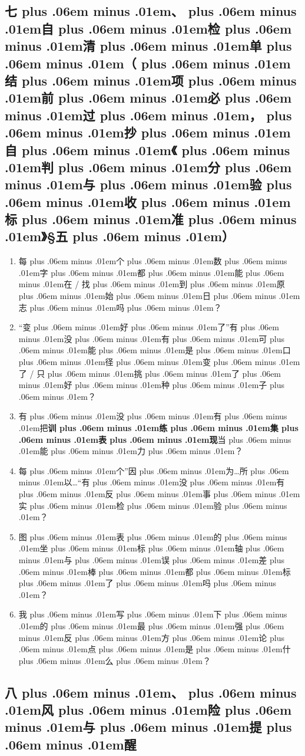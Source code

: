 \documentclass[
]{article}
\newcommand{\passthrough}[1]{#1}
\providecommand{\tightlist}{%
  \setlength{\itemsep}{0pt}\setlength{\parskip}{0pt}}
\def\zh#1{{\zhfont #1}}
\def\sym#1{{\symfont #1}}
\def\codezh#1{{\zhmonofont #1}}
\def\zhglue{\hskip0pt plus .06em minus .01em}
\begin{document}
\subsection{\zh{七\zhglue 、\zhglue 自\zhglue 检\zhglue 清\zhglue 单\zhglue （\zhglue 结\zhglue 项\zhglue 前\zhglue 必\zhglue 过\zhglue ，\zhglue 抄\zhglue 自\zhglue 《\zhglue 判\zhglue 分\zhglue 与\zhglue 验\zhglue 收\zhglue 标\zhglue 准\zhglue 》}\sym{§}\zh{五\zhglue ）}}\label{ux4e03ux81eaux68c0ux6e05ux5355ux7ed3ux9879ux524dux5fc5ux8fc7ux6284ux81eaux5224ux5206ux4e0eux9a8cux6536ux6807ux51c6ux4e94}

\begin{enumerate}
\def\labelenumi{\arabic{enumi}.}
\tightlist
\item
  \zh{每\zhglue 个\zhglue 数\zhglue 字\zhglue 都\zhglue 能\zhglue 在} \passthrough{\codezh{{\zh{证}}{\zh{据}}/}} \zh{找\zhglue 到\zhglue 原\zhglue 始\zhglue 日\zhglue 志\zhglue 吗\zhglue ？}
\item
  ``\zh{变\zhglue 好\zhglue 了}''\zh{有\zhglue 没\zhglue 有\zhglue 可\zhglue 能\zhglue 是\zhglue 口\zhglue 径\zhglue 变\zhglue 了} / \zh{只\zhglue 挑\zhglue 了\zhglue 好\zhglue 种\zhglue 子\zhglue ？}
\item
  \zh{有\zhglue 没\zhglue 有\zhglue 把}\textbf{\zh{训\zhglue 练\zhglue 集\zhglue 表\zhglue 现}}\zh{当\zhglue 能\zhglue 力\zhglue ？}
\item
  \zh{每\zhglue 个}''\zh{因\zhglue 为}\ldots \zh{所\zhglue 以}\ldots``\zh{有\zhglue 没\zhglue 有\zhglue 反\zhglue 事\zhglue 实\zhglue 检\zhglue 验\zhglue ？}
\item
  \zh{图\zhglue 表\zhglue 的\zhglue 坐\zhglue 标\zhglue 轴\zhglue 与\zhglue 误\zhglue 差\zhglue 棒\zhglue 都\zhglue 标\zhglue 了\zhglue 吗\zhglue ？}
\item
  \zh{我\zhglue 写\zhglue 下\zhglue 的\zhglue 最\zhglue 强\zhglue 反\zhglue 方\zhglue 论\zhglue 点\zhglue 是\zhglue 什\zhglue 么\zhglue ？}
\end{enumerate}

\subsection{\zh{八\zhglue 、\zhglue 风\zhglue 险\zhglue 与\zhglue 提\zhglue 醒}}\label{ux516bux98ceux9669ux4e0eux63d0ux9192}
\end{document}

